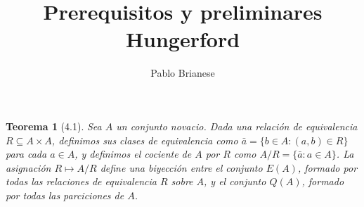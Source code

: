 \documentclass{report}
\title{Prerequisitos y preliminares \\ Hungerford}
\author{Pablo Brianese}
\newtheorem{theorem}{Teorema}
\begin{document}
  \maketitle

  \begin{theorem}[4.1]
    Sea \(A\) un conjunto novacio.
    Dada una relación de equivalencia \(R \subseteq A \times A\), definimos sus clases de equivalencia como \(\bar{a} = \{b \in A : (a, b) \in R\}\) para cada \(a \in A\), y definimos el cociente de \(A\) por \(R\) como \(A / R = \{\bar{a} : a \in A\}\).
    La asignación \(R \mapsto A / R\) define una biyección entre el conjunto \(E(A)\), formado por todas las relaciones de equivalencia \(R\) sobre \(A\), y el conjunto \(Q(A)\), formado por todas las parciciones de \(A\).
  \end{theorem}
\end{document}
